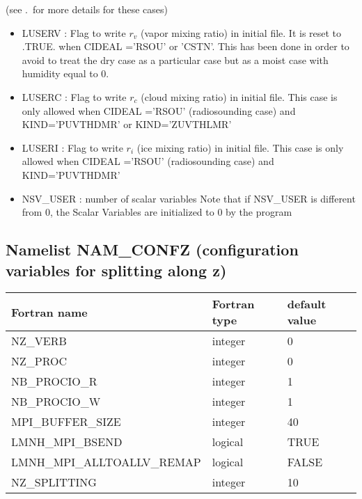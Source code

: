 (see \thechapter.\thesection \ for more details for these cases)
\begin{itemize}

\item  LUSERV   : Flag to write
$r_{v}$ (vapor mixing ratio) in initial file. It is reset to .TRUE.
when CIDEAL ='RSOU' or 'CSTN'. This has been done in order to avoid
to treat the dry case as a particular case but as a moist case with
humidity equal to 0.

\item  LUSERC   : Flag to write
$r_{c}$ (cloud mixing ratio) in initial file. This case is only
allowed when CIDEAL ='RSOU' (radiosounding case) and KIND='PUVTHDMR'
or KIND='ZUVTHLMR'

\item  LUSERI   : Flag to write
$r_{i}$ (ice mixing ratio) in initial file. This case is only
allowed when CIDEAL ='RSOU' (radiosounding case) and KIND='PUVTHDMR'

\item NSV\_USER : number of
scalar variables Note that if NSV\_USER is different from 0, the
Scalar Variables are initialized to 0  by the program

\end{itemize}

\subsection{Namelist NAM\_CONFZ (configuration variables for
splitting along z)\label{s:namconfz}}

\begin{center}
\begin{tabular} {|l|l|l|}
\hline
Fortran name & Fortran type & default value \\
\hline
NZ\_VERB & integer & 0 \\
NZ\_PROC & integer & 0 \\
NB\_PROCIO\_R & integer & 1 \\
NB\_PROCIO\_W & integer & 1 \\
MPI\_BUFFER\_SIZE & integer & 40 \\
LMNH\_MPI\_BSEND  & logical & TRUE \\
LMNH\_MPI\_ALLTOALLV\_REMAP & logical & FALSE \\
NZ\_SPLITTING & integer & 10 \\
\hline
\end{tabular}
\end{center}

